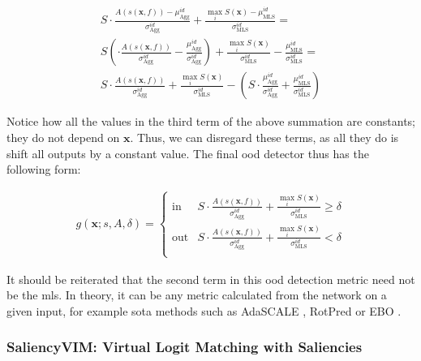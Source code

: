 \documentclass[UKenglish]{uiomasterthesis} %
\theoremstyle{definition}
\begin{document}
\begin{gather}
S \cdot \frac{A(s(\bm{x}, f)) - \mu_{\text{Agg}}^{id}}{\sigma_{\text{Agg}}^{id}} + \frac{\max_i S(\bm{x}) - \mu_{\text{MLS}}^{id}}{\sigma_{\text{MLS}}^{id}} = \\
S \left( \cdot \frac{A(s(\bm{x}, f))}{\sigma_{\text{Agg}}^{id}} - \frac{\mu_{\text{Agg}}^{id}}{\sigma_{\text{Agg}}^{id}} \right) + \frac{\max_i S(\bm{x})}{\sigma_{\text{MLS}}^{id}} - \frac{\mu_{\text{MLS}}^{id}}{\sigma_{\text{MLS}}^{id}} = \\
S \cdot \frac{A(s(\bm{x}, f))}{\sigma_{\text{Agg}}^{id}} + \frac{\max_i S(\bm{x})}{\sigma_{\text{MLS}}^{id}} - \left(S \cdot \frac{\mu_{\text{Agg}}^{id}}{\sigma_{\text{Agg}}^{id}} + \frac{\mu_{\text{MLS}}^{id}}{\sigma_{\text{MLS}}^{id}} \right)
\end{gather}

Notice how all the values in the third term of the above summation are constants; they do not depend on $\bm{x}$. Thus, we can disregard these terms, as all they do is shift all outputs by a constant value. The final \ac{ood} detector thus has the following form:

{\large
\begin{align}
    g(\bm{x}; s, A, \delta)=\begin{cases} 
    \text{in } &  S \cdot \frac{A(s(\bm{x}, f))}{\sigma_{\text{Agg}}^{id}} + \frac{\max_i S(\bm{x})}{\sigma_{\text{MLS}}^{id}} \ge \delta \\[10pt]
    \text{out} &  S \cdot \frac{A(s(\bm{x}, f))}{\sigma_{\text{Agg}}^{id}} + \frac{\max_i S(\bm{x})}{\sigma_{\text{MLS}}^{id}} < \delta \\[10pt]
   \end{cases}
\label{eq:aggregate}
\end{align}
}

It should be reiterated that the second term in this \ac{ood} detection metric need not be the \ac{mls}. In theory, it can be any metric calculated from the network on a given input, for example \ac{sota} methods such as AdaSCALE \cite{adascale}, RotPred \cite{rotpred} or EBO \cite{energy}.

\subsubsection{SaliencyVIM: Virtual Logit Matching with Saliencies} \label{section:saliencyvim_method}
\end{document}

